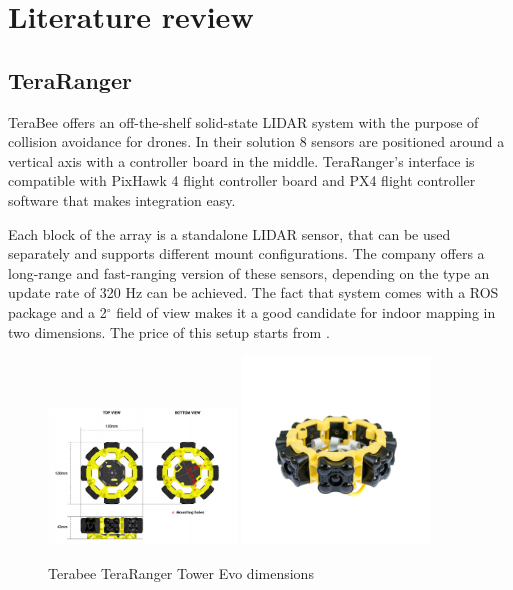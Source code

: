 \chapter{Literature review}

\section{TeraRanger}
TeraBee offers an off-the-shelf solid-state LIDAR system with the purpose of collision avoidance for drones.
In their solution 8 sensors are positioned around a vertical axis with a controller board in the middle. 
TeraRanger's interface is compatible with PixHawk 4 flight controller board and PX4 flight controller 
software that makes integration easy.

Each block of the array is a standalone LIDAR sensor, that can be used separately and supports different
mount configurations. The company offers a long-range and fast-ranging version of these sensors, depending 
on the type an update rate of 320 Hz can be achieved. The fact that system comes with a ROS package and a 
2$^{\circ}$ field of view makes it a good candidate for indoor mapping in two dimensions. The price of this setup 
starts from . \cite{TerabeeTeraRanger}

\begin{figure}[!ht]
    \centering
    \includegraphics[width=50mm, keepaspectratio]{figures/tera_ranger_tower.png}\hspace{1cm}
    \includegraphics[width=50mm, keepaspectratio]{figures/tera_ranger_tower_2.png}
    \caption{Terabee TeraRanger Tower Evo dimensions}
    \label{fig:teraranger_dimensions}
\end{figure}

